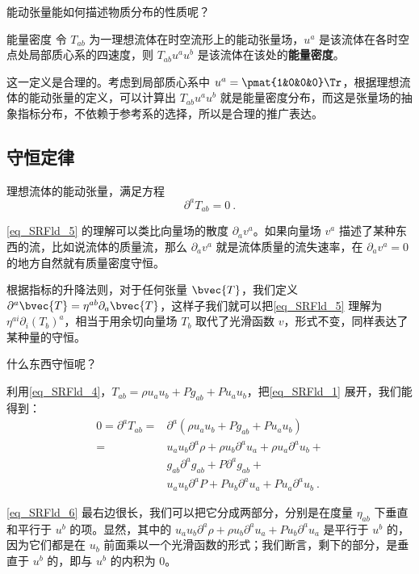 能动张量能如何描述物质分布的性质呢？

\begin{definition}{能量密度}
令 $T_{ab}$ 为一理想流体在时空流形上的能动张量场，$u^a$ 是该流体在各时空点处局部质心系的四速度，则 $T_{ab}u^au^b$ 是该流体在该处的\textbf{能量密度}。
\end{definition}

这一定义是合理的。考虑到局部质心系中 $u^a=\pmat{1&0&0&0}\Tr$，根据理想流体的能动张量的定义，可以计算出 $T_{ab}u^au^b$ 就是能量密度分布，而这是张量场的抽象指标分布，不依赖于参考系的选择，所以是合理的推广表达。

\subsection{守恒定律}

理想流体的能动张量，满足方程
\begin{equation}\label{eq_SRFld_5}
\partial^aT_{ab}=0~.
\end{equation}

\autoref{eq_SRFld_5} 的理解可以类比向量场的散度 $\partial_av^a$。如果向量场 $v^a$ 描述了某种东西的流，比如说流体的质量流，那么 $\partial_av^a$ 就是流体质量的流失速率，在 $\partial_av^a=0$ 的地方自然就有质量密度守恒。

根据指标的升降法则，对于任何张量 $\bvec{T}$，我们定义 $\partial^a\bvec{T}=\eta^{ab}\partial_a\bvec{T}$，这样子我们就可以把\autoref{eq_SRFld_5} 理解为 $\eta^{ai}\partial_i(T_b)^a$，相当于用余切向量场 $T_b$ 取代了光滑函数 $v$，形式不变，同样表达了某种量的守恒。

什么东西守恒呢？

利用\autoref{eq_SRFld_4}，$T_{ab}=\rho u_au_b+P g_{ab}+P u_au_b$，把\autoref{eq_SRFld_1} 展开，我们能得到：
\begin{equation}\label{eq_SRFld_6}
\begin{aligned}
0=\partial^aT_{ab}=&\partial^a(\rho u_au_b+P g_{ab}+P u_au_b)\\
=&u_au_b\partial^a\rho+\rho u_b\partial^au_a+\rho u_a\partial^au_b+\\
&g_{ab}\partial^ag_{ab}+P\partial^ag_{ab}+\\
&u_au_b\partial^aP+P u_b\partial^au_a+P u_a\partial^au_b~.
\end{aligned}
\end{equation}

\autoref{eq_SRFld_6} 最右边很长，我们可以把它分成两部分，分别是在度量 $\eta_{ab}$ 下垂直和平行于 $u^b$ 的项。显然，其中的 $u_au_b\partial^a\rho+\rho u_b\partial^au_a+P u_b\partial^au_a$ 是平行于 $u^b$ 的，因为它们都是在 $u_b$ 前面乘以一个光滑函数的形式；我们断言，剩下的部分，是垂直于 $u^b$ 的，即与 $u^b$ 的内积为 $0$。

